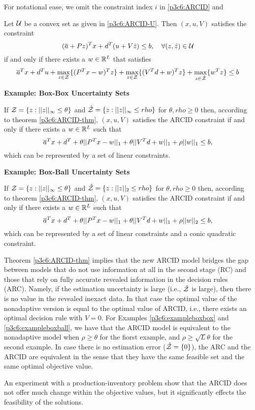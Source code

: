 For notational ease, we omit the constraint index $i$ in \eqref{p3c6:ARCID} and 

\begin{theorem}\label{p3c6:ARCID-thm}
Let $\mathcal{U}$ be a convex set as given in \eqref{p3c6:ARCID-U}. Then $(x,u,V)$ satisfies the constraint
\[  (\overline{ a }+Pz)^Tx + d^T(u+V\hat{z}) \leq b, \quad \forall (z,\hat{z})\in\mathcal{U}\]
if and only if there exists a $w\in\mathbb{R}^L$ that satisfies
\[ \overline{ a }^Tx+d^Tu+ \max_{z\in\mathcal{Z}} \{(P^Tx-w)^Tz\} + \max_{z\in\mathcal{Z}}\{ (V^Td+w)^Tz\} + \max_{z\in\hat{\mathcal{Z}}} \{w^Tz\}\leq b\]
\end{theorem}

\textbf{Example: Box-Box Uncertainty Sets}\label{p3c6:exampleboxbox}

If $\mathcal{Z} = \{z : \vert\vert z \vert\vert_\infty \leq \theta \}$ and $\hat{\mathcal{Z}} = \{z : \vert\vert z \vert\vert_\infty \leq rho \}$ for $\theta, rho \geq 0$ then, according to theorem \eqref{p3c6:ARCID-thm}, $(x,u,V)$ satisfies the ARCID constraint if and only if there exists a $w\in\mathbb{R}^L$ such that
\[\overline{ a }^Tx+d^T+\theta \vert\vert P^Tx-w \vert\vert_1 + \theta\vert\vert V^Td+w \vert\vert_1+\rho\vert\vert w \vert\vert_1\leq b,\]
which can be represented by a set of linear constraints.


\textbf{Example: Box-Ball Uncertainty Sets}\label{p3c6:exampleboxball}

If $\mathcal{Z} = \{z : \vert\vert z \vert\vert_\infty \leq \theta \}$ and $\hat{\mathcal{Z}} = \{z : \vert\vert z \vert\vert_2 \leq rho \}$ for $\theta, rho \geq 0$ then, according to theorem \eqref{p3c6:ARCID-thm}, $(x,u,V)$ satisfies the ARCID constraint if and only if there exists a $w\in\mathbb{R}^L$ such that
\[\overline{ a }^Tx+d^T+\theta \vert\vert P^Tx-w \vert\vert_1 + \theta\vert\vert V^Td+w \vert\vert_1+\rho\vert\vert w \vert\vert_2\leq b,\]
which can be represented by a set of linear constraints and a conic quadratic constraint.


Theorem \eqref{p3c6:ARCID-thm} implies that the new ARCID model bridges the gap between models that do not use information at all in the second stage (RC) and those that rely on fully accurate revealed information in the decision rules (ARC). Namely, if the estimation uncertainty is large (i.e., $\hat{\mathcal{Z}}$ is large), then there is no value in the revealed inexact data. In that case the optimal value of the nonadaptive version is equal to the optimal value of ARCID, i.e., there exists an optimal decision rule with $V = 0$. For Examples \eqref{p3c6:exampleboxbox} and \eqref{p3c6:exampleboxball}, we have that  the ARCID model is equivalent to the nonadaptive model when $\rho\geq\theta$ for the fiorst example, and $\rho\geq \sqrt{L}\theta$ for the second example. In case there is no estimation error ($\hat{\mathcal{Z}} = \{ 0 \}$), the ARC and the ARCID are equivalent in the sense that they have the same feasible set and the same optimal objective value.

An experiment with a production-inventory problem show that the ARCID does not offer much change within the objective values, but it significantly effects the feasibility of the solutions.